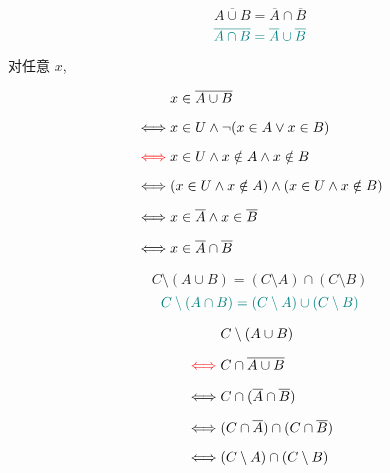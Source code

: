 \begin{frame}{}
  \begin{theorem}

    \[
      \overline{A \cup B} = \overline{A} \cap \overline{B}
    \]
    \[
      \textcolor{teal}{\overline{A \cap B} = \overline{A} \cup \overline{B}}
    \]
  \end{theorem}

  \pause
  \vspace{0.30cm}
  \begin{center}
    对任意 $x$,
  \end{center}
  \setcounter{equation}{0}
  \begin{align}
    &x \in \overline{A \cup B} \\[6pt]
    \iff & x \in U \land \lnot (x \in A \lor x \in B) \\[6pt]
    \textcolor{red}{\iff} & x \in U \land x \notin A \land x \notin B \\[6pt]
    \iff & (x \in U \land x \notin A) \land (x \in U \land x \notin B) \\[6pt]
    \iff & x \in \overline{A} \land x \in \overline{B} \\[6pt]
    \iff & x \in \overline{A} \cap \overline{B}
  \end{align}
\end{frame}

\begin{frame}{}
  \begin{theorem}
    \[
      C \setminus (A \cup B) = (C \setminus A) \cap (C \setminus B)
    \]
    \[
      \textcolor{teal}{C \setminus (A \cap B) = (C \setminus A) \cup (C \setminus B)}
    \]
  \end{theorem}

  \pause
  \vspace{0.30cm}
  \setcounter{equation}{0}
  \begin{align}
    &C \setminus (A \cup B) \\[6pt]
    \textcolor{red}{\iff} & C \cap \overline{A \cup B} \\[6pt]
    \iff & C \cap (\overline{A} \cap \overline{B}) \\[6pt]
    \iff & (C \cap \overline{A}) \cap (C \cap \overline{B}) \\[6pt]
    \iff & (C \setminus A) \cap (C \setminus B)
  \end{align}
\end{frame}

